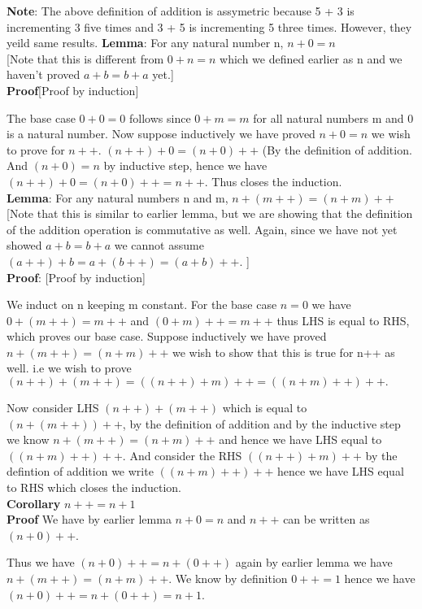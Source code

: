\documentclass[10pt]{article}
\begin{document}
\begin{flushleft}
\textbf{Note}: The above definition of addition is assymetric because 5 + 3 is
incrementing 3 five times and 3 + 5 is incrementing 5 three times. However, they
yeild same results.
\newpage
\textbf{Lemma}: For any natural number n, $ n + 0 = n $
\\[3pt]
  [Note that this is different from $0 + n = n$ which we defined earlier as n
    and we haven't proved $ a + b = b + a $ yet.]
\\[4pt]
\textbf{Proof}[Proof by induction]

The base case $0 + 0 = 0$ follows since $0 + m = m$ for all natural numbers m
and 0 is a natural number. Now suppose inductively we have proved $n + 0 = n$ we
wish to prove for $n++$. $(n++) + 0 = (n + 0)++$ (By the definition of
addition. And $(n + 0) = n$ by inductive step, hence we have
$ (n++) + 0 = (n + 0)++ = n++$. Thus closes the induction.
\\[6pt]
\textbf{Lemma}: For any natural numbers n and m, $ n + (m++) = (n + m)++ $
\\[3pt]
  [Note that this is similar to earlier lemma, but we are showing that the
    definition of the addition operation is commutative as well. Again, since we
    have not yet showed $ a + b = b + a $ we cannot assume $ (a++) + b = a +
    (b++) = (a + b)++. $ ]
\\[4pt]
\textbf{Proof}: [Proof by induction]

We induct on n keeping m constant. For the base case $n = 0$ we have $ 0 + (m++)
= m++ $ and $ (0 + m)++ = m++ $ thus LHS is equal to RHS, which proves our base
case. Suppose inductively we have proved $ n + (m++) = (n + m)++ $ we wish to
show that this is true for n++ as well. i.e we wish to prove $ (n++) + (m++) =
((n++) + m)++ = ((n + m)++)++. $

Now consider LHS $ (n++) + (m++)$ which is equal to $ (n + (m++))++$, by the
definition of addition and by the inductive step we know $ n + (m++) = (n +
m)++$ and hence we have LHS equal to $((n + m)++)++ $. And consider the RHS
$((n++) + m)++ $ by the defintion of addition we write $((n + m)++)++$ hence we
have LHS equal to RHS which closes the induction.
\\[6pt]
\textbf{Corollary} $n++ = n + 1$
\\[4pt]
\textbf{Proof} We have by earlier lemma $ n + 0 = n$ and $n++$ can be written as
$ (n +0)++$.

Thus we have  $ (n + 0)++ = n + (0++) $ again by earlier lemma we
have $ n + (m++) = (n + m)++ $. We know by definition $ 0++ = 1$ hence we have
$ (n + 0)++ = n + (0++) = n + 1 $.

\end{flushleft}
\end{document}
